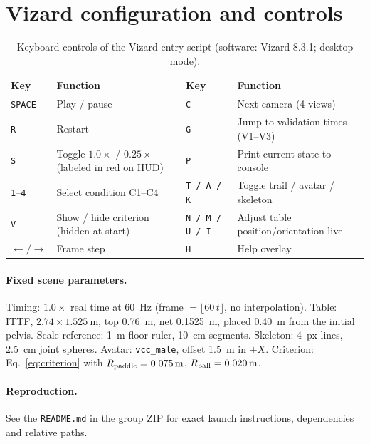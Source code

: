 \section{Vizard configuration and controls}\label{app:config}

\begin{table}[h]
    \centering
    \caption{Keyboard controls of the Vizard entry script (software: Vizard 8.3.1; desktop mode).}\label{tab:controls}
    \footnotesize
    \begin{tabularx}{\textwidth}{@{}l Y l Y@{}}
        \toprule
        \textbf{Key}             & \textbf{Function}                                         & \textbf{Key}           & \textbf{Function}                      \\
        \midrule
        \texttt{SPACE}           & Play / pause                                              & \texttt{C}             & Next camera (4 views)                  \\
        \texttt{R}               & Restart                                                   & \texttt{G}             & Jump to validation times (V1--V3)      \\
        \texttt{S}               & Toggle $1.0\times$ / $0.25\times$ (labeled in red on HUD) & \texttt{P}             & Print current state to console         \\
        \texttt{1}--\texttt{4}   & Select condition C1--C4                                   & \texttt{T / A / K}     & Toggle trail / avatar / skeleton       \\
        \texttt{V}               & Show / hide criterion (hidden at start)                   & \texttt{N / M / U / I} & Adjust table position/orientation live \\
        $\leftarrow/\rightarrow$ & Frame step                                                & \texttt{H}             & Help overlay                           \\
        \bottomrule
    \end{tabularx}
\end{table}

\paragraph{Fixed scene parameters.} Timing: $1.0\times$ real time at \SI{60}{\hertz} (frame $=\lfloor 60\,t\rfloor$, no interpolation). Table: ITTF, $2.74\times\SI{1.525}{\meter}$, top \SI{0.76}{\meter}, net \SI{0.1525}{\meter}, placed \SI{0.40}{\meter} from the initial pelvis. Scale reference: \SI{1}{\meter} floor ruler, \SI{10}{\centi\meter} segments. Skeleton: 4~px lines, \SI{2.5}{\centi\meter} joint spheres. Avatar: \texttt{vcc\_male}, offset \SI{1.5}{\meter} in $+X$. Criterion: Eq.~\eqref{eq:criterion} with $R_{\mathrm{paddle}}=\SI{0.075}{\meter}$, $R_{\mathrm{ball}}=\SI{0.020}{\meter}$.

\paragraph{Reproduction.} See the \texttt{README.md} in the group ZIP for exact launch instructions, dependencies and relative paths.
